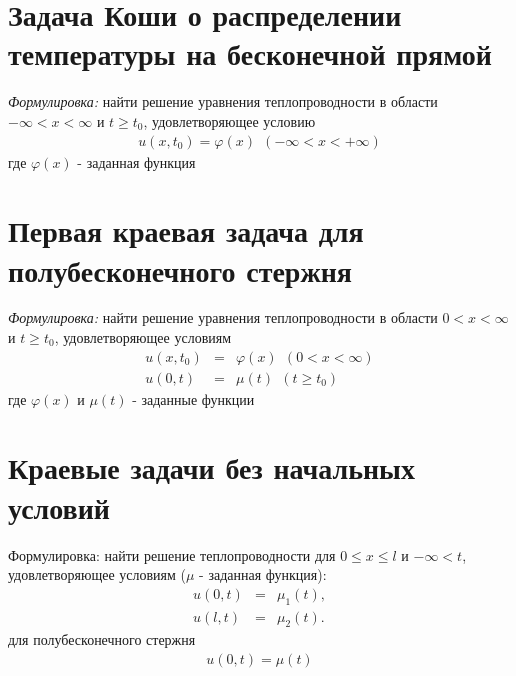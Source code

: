 \documentclass{article}[12pt]
\begin{document}
\section{Задача Коши о распределении температуры на бесконечной прямой}
\textit{Формулировка:} найти решение уравнения теплопроводности в области
$-\infty < x < \infty$ и $t \geqslant t_{0}$, удовлетворяющее условию
\begin{eqnarray*}
    u(x,t_{0})=\varphi(x)\ \ (-\infty < x < +\infty)
\end{eqnarray*}
где $\varphi(x)$ - заданная функция

\section{Первая краевая задача для полубесконечного стержня}
\textit{Формулировка:} найти решение уравнения теплопроводности в области $0 < x
< \infty$ и $t \geqslant t_{0}$, удовлетворяющее условиям
\begin{eqnarray*}
    u(x,t_{0}) & = & \varphi(x)\ \ (0 < x < \infty)\\
    u(0,t) & = & \mu(t)\ \ (t \geqslant t_{0})
\end{eqnarray*}
где $\varphi(x)$ и $\mu(t)$ - заданные функции

\section{Краевые задачи без начальных условий}
Формулировка: найти решение теплопроводности для $0 \leqslant x
\leqslant l$ и $-\infty < t$, удовлетворяющее условиям ($\mu$ - заданная
функция):
\begin{eqnarray*}
    u(0,t) & = & \mu_{1}(t),\\
    u(l,t) &=&\mu_{2}(t).
\end{eqnarray*}
для полубесконечного стержня
\begin{eqnarray*}
    u(0,t)=\mu(t)
\end{eqnarray*}
\end{document}
